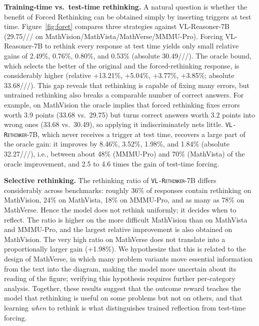 \documentclass{article}
\newcommand{\model}{\texttt{\textsc{VL-Rethinker}}\xspace}
\begin{document}
\textbf{Training-time vs.\ test-time rethinking.} A natural question is whether the benefit of Forced Rethinking can be obtained simply by inserting triggers at test time. Figure~\ref{fig:foret} compares three strategies against VL-Reasoner-7B (29.75/// on MathVision/\allowbreak MathVista/\allowbreak MathVerse/\allowbreak MMMU-Pro). Forcing VL-Reasoner-7B to rethink every response at test time yields only small relative gains of 2.49\%, 0.76\%, 0.80\%, and 0.53\% (absolute 30.49///). The oracle bound, which selects the better of the original and the forced-rethinking response, is considerably higher (relative +13.21\%, +5.04\%, +3.77\%, +3.85\%; absolute 33.68///). This gap reveals that rethinking is capable of fixing many errors, but untrained rethinking also breaks a comparable number of correct answers. For example, on MathVision the oracle implies that forced rethinking fixes errors worth 3.9 points (33.68 vs.\ 29.75) but turns correct answers worth 3.2 points into wrong ones (33.68 vs.\ 30.49), so applying it indiscriminately nets little. \model-7B, which never receives a trigger at test time, recovers a large part of the oracle gain: it improves by 8.46\%, 3.52\%, 1.98\%, and 1.84\% (absolute 32.27///), i.e., between about 48\% (MMMU-Pro) and 70\% (MathVista) of the oracle improvement, and 2.5 to 4.6 times the gain of test-time forcing.

\textbf{Selective rethinking.} The rethinking ratio of \model-7B differs considerably across benchmarks: roughly 36\% of responses contain rethinking on MathVision, 24\% on MathVista, 18\% on MMMU-Pro, and as many as 78\% on MathVerse. Hence the model does not rethink uniformly; it decides when to reflect. The ratio is higher on the more difficult MathVision than on MathVista and MMMU-Pro, and the largest relative improvement is also obtained on MathVision. The very high ratio on MathVerse does not translate into a proportionally larger gain (+1.98\%). We hypothesize that this is related to the design of MathVerse, in which many problem variants move essential information from the text into the diagram, making the model more uncertain about its reading of the figure; verifying this hypothesis requires further per-category analysis. Together, these results suggest that the outcome reward teaches the model that rethinking is useful on some problems but not on others, and that learning \emph{when} to rethink is what distinguishes trained reflection from test-time forcing.
\end{document}
